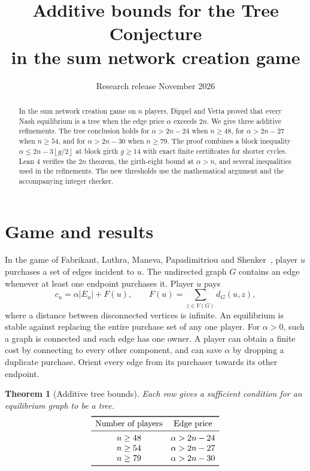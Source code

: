 \documentclass[11pt]{article}
\title{Additive bounds for the Tree Conjecture\\ in the sum network creation game}
\author{}
\date{Research release \quad November 2026}
\newtheorem{theorem}{Theorem}
\newcommand{\dG}{d_G}
\newcommand{\floor}[1]{\left\lfloor#1\right\rfloor}
\newcommand{\abs}[1]{\left|#1\right|}
\begin{document}
\maketitle
\begin{abstract}
In the sum network creation game on \(n\) players, Dippel and Vetta
proved that every Nash equilibrium is a tree when the edge price
\(\alpha\) exceeds \(2n\). We give three additive refinements.
The tree conclusion holds for \(\alpha>2n-24\) when \(n\ge48\),
for \(\alpha>2n-27\) when \(n\ge54\), and for \(\alpha>2n-30\)
when \(n\ge79\). The proof combines a block inequality
\(\alpha\le 2n-3\floor{g/2}\) at block girth \(g\ge14\) with
exact finite certificates for shorter cycles. Lean 4 verifies
the \(2n\) theorem, the girth-eight bound at \(\alpha>n\), and
several inequalities used in the refinements. The new thresholds
use the mathematical argument and the accompanying integer checker.
\end{abstract}

\section{Game and results}

In the game of Fabrikant, Luthra, Maneva, Papadimitriou and
Shenker~\cite{fabrikant}, player \(u\) purchases a set of edges
incident to \(u\). The undirected graph \(G\) contains an edge
whenever at least one endpoint purchases it. Player \(u\) pays
\[
 c_u=\alpha\abs{E_u} + F(u),\qquad
 F(u)=\sum_{z\in V(G)}\dG(u,z),
\]
where a distance between disconnected vertices is infinite.
An equilibrium is stable against replacing the entire purchase set of
any one player. For \(\alpha>0\), such a graph is connected and
each edge has one owner. A player can obtain a finite cost by
connecting to every other component, and can save \(\alpha\) by
dropping a duplicate purchase. Orient every edge from its purchaser
towards its other endpoint.

\begin{theorem}[Additive tree bounds]\label{thm:main}
Each row gives a sufficient condition for an equilibrium graph to
be a tree.
\[
\begin{array}{cc}
\toprule
\text{Number of players} & \text{Edge price}\\
\midrule
n\ge48 & \alpha>2n-24\\
n\ge54 & \alpha>2n-27\\
n\ge79 & \alpha>2n-30\\
\bottomrule
\end{array}
\]
\end{theorem}
\end{document}
